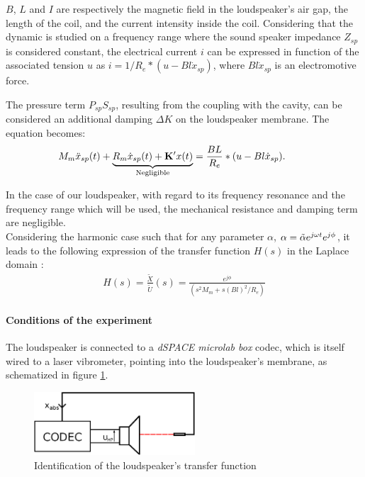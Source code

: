 \documentclass[11pt, twocolumn]{article}
\begin{document}
 \noindent
 $B$, $L$ and $I$ are respectively the magnetic field in the loudspeaker's air gap, the length of the coil, and the current intensity inside the coil.
 Considering that the dynamic is studied on a frequency range where the sound speaker impedance $Z_{sp}$ is considered constant, the electrical current $i$ can be expressed in function of the associated tension $u$ as $i =  1/R_e *(u - Bl \Dot{x}_{sp})$, where $Bl \Dot{x}_{sp}$ is an electromotive force.
 
 
 The pressure term $P_{sp}S_{sp}$, resulting from the coupling with the cavity, can be considered an additional damping $\Delta K$ on the loudspeaker membrane. The equation becomes:
 \vspace{-0.2cm}
 \begin{align}
    \hspace{-25pt} M_m \Ddot{x}_{sp}(t) + \underbrace{R_m \Dot{x}_{sp}(t) + \mathbf{K'} x(t)}_{\text{Negligible}} = \frac{BL}{R_e} *(u - Bl \Dot{x}_{sp}).
\end{align}
 
 In the case of our loudspeaker, with regard to its frequency resonance and the frequency range which will be used, the mechanical resistance and damping term are negligible. \\

 Considering the harmonic case such that for any parameter $\alpha$, $\alpha = \Tilde{\alpha} e^{j \omega t } e^{j \phi}$, it leads to the following expression of the transfer function $H(s)$ in the Laplace domain :
 \vspace{-0.2cm}
\begin{align}
     H(s) = \frac{\tilde{X} }{\tilde{U} } (s) = 
     \frac{  e^{j \phi } }
     { ( s^2  M_m + s  (Bl)^2/R_e)}
     \label{FRF_HP_expression_nosimplification}
\end{align}
 
 
\paragraph{Conditions of the experiment}

The loudspeaker is connected to a \textit{dSPACE microlab box} codec, which is itself wired to a laser vibrometer, pointing into the loudspeaker's membrane, as schematized in figure \ref{laserexp}.

\begin{figure}[h!]
    \centering
    \includegraphics[width = 6cm]{lazer.eps}
    \caption{\scriptsize{Identification of the loudspeaker's transfer function}}
    \label{laserexp}
\end{figure}
\end{document}
